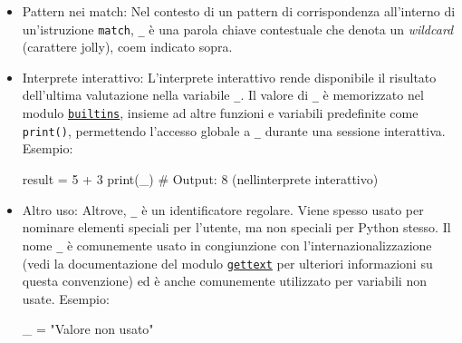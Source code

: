 \documentclass[
  letterpaper,
]{scrbook}
\newenvironment{Shaded}{\begin{snugshade}}{\end{snugshade}}
\newcommand{\BuiltInTok}[1]{\textcolor[rgb]{0.00,0.23,0.31}{#1}}
\newcommand{\CommentTok}[1]{\textcolor[rgb]{0.37,0.37,0.37}{#1}}
\newcommand{\DecValTok}[1]{\textcolor[rgb]{0.68,0.00,0.00}{#1}}
\newcommand{\NormalTok}[1]{\textcolor[rgb]{0.00,0.23,0.31}{#1}}
\newcommand{\OperatorTok}[1]{\textcolor[rgb]{0.37,0.37,0.37}{#1}}
\newcommand{\StringTok}[1]{\textcolor[rgb]{0.13,0.47,0.30}{#1}}
\providecommand{\tightlist}{%
  \setlength{\itemsep}{0pt}\setlength{\parskip}{0pt}}\usepackage{longtable,booktabs,array}
\newcommand*\circled[1]{\tikz[baseline=(char.base)]{
          \node[shape=circle,draw,inner sep=1pt] (char) {{\scriptsize#1}};}}
\begin{document}
\begin{itemize}
\begin{itemize}
  \item
    Pattern nei match: Nel contesto di un pattern di corrispondenza
    all'interno di un'istruzione \texttt{match}, \texttt{\_} è una
    parola chiave contestuale che denota un \emph{wildcard} (carattere
    jolly), coem indicato sopra.
  \item
    Interprete interattivo: L'interprete interattivo rende disponibile
    il risultato dell'ultima valutazione nella variabile \texttt{\_}. Il
    valore di \texttt{\_} è memorizzato nel modulo
    \href{https://docs.python.org/3/library/builtins.html}{\texttt{builtins}},
    insieme ad altre funzioni e variabili predefinite come
    \texttt{print()}, permettendo l'accesso globale a \texttt{\_}
    durante una sessione interattiva. Esempio:

\begin{Shaded}
\begin{Highlighting}[]
\NormalTok{result }\OperatorTok{=} \DecValTok{5} \OperatorTok{+} \DecValTok{3}
\BuiltInTok{print}\NormalTok{(\_)  }\CommentTok{\# Output: 8 (nell\textquotesingle{}interprete interattivo)}
\end{Highlighting}
\end{Shaded}
  \item
    Altro uso: Altrove, \texttt{\_} è un identificatore regolare. Viene
    spesso usato per nominare elementi speciali per l'utente, ma non
    speciali per Python stesso. Il nome \texttt{\_} è comunemente usato
    in congiunzione con l'internazionalizzazione (vedi la documentazione
    del modulo
    \href{https://docs.python.org/3/library/gettext.html}{\texttt{gettext}}
    per ulteriori informazioni su questa convenzione) ed è anche
    comunemente utilizzato per variabili non usate. Esempio:

\label{annotated-cell-167}%
\begin{Shaded}
\begin{Highlighting}[]
\NormalTok{\_ }\OperatorTok{=} \StringTok{"Valore non usato"} \hspace*{\fill}\NormalTok{\circled{1}}


\end{Highlighting}
\end{Shaded}
\end{itemize}
\end{itemize}
\end{document}
